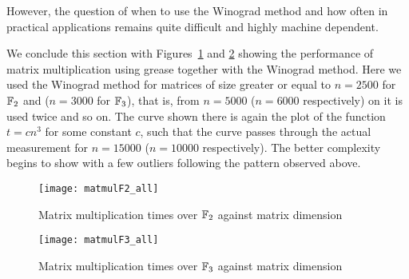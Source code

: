 However, the question of when to use the Winograd method and how often
in practical applications remains quite difficult and highly machine
dependent.

%
%

We conclude this section with Figures~\ref{matmulf2} and
\ref{matmulf3} showing the
performance of matrix multiplication using grease together with
the Winograd method. Here we used the Winograd method for matrices
of size greater or equal to $n=2500$ for $\mathbb{F}_2$ and ($n=3000$ for
$\mathbb{F}_3$), that is, from $n=5000$ ($n=6000$ respectively) on it
is used twice and so on. The curve shown there is 
again the plot of the function $t = cn^3$ for some constant $c$, such
that the curve passes through the actual measurement for $n=15000$
($n=10000$ respectively).
The better complexity begins to show with a few outliers following
the pattern observed above.

\begin{figure}[ht]
\begin{center}
\texttt{[image: matmulF2\_all]}
\end{center}
\caption{Matrix multiplication times over $\mathbb{F}_2$ against matrix dimension}
\label{matmulf2}
\end{figure}

\begin{figure}[ht]
\begin{center}
\texttt{[image: matmulF3\_all]}
\end{center}
\caption{Matrix multiplication times over $\mathbb{F}_3$ against matrix dimension}
\label{matmulf3}
\end{figure}

